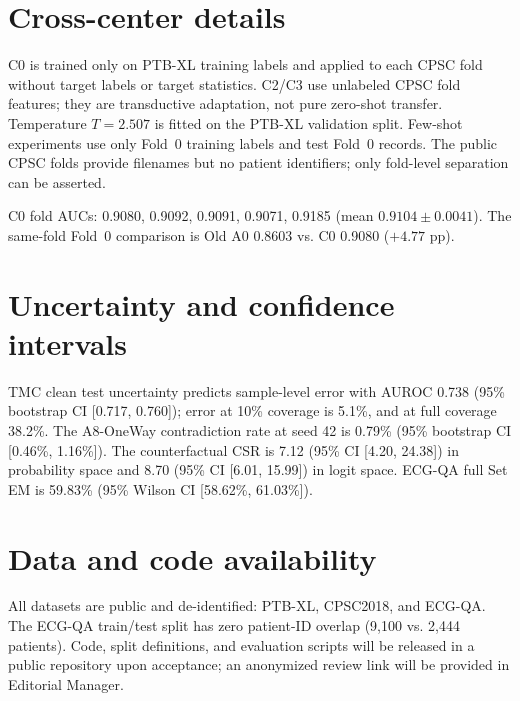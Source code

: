 \documentclass[11pt]{article}
\begin{document}
\section{Cross-center details}
C0 is trained only on PTB-XL training labels and applied to each CPSC fold without target labels or target statistics. C2/C3 use unlabeled CPSC fold features; they are transductive adaptation, not pure zero-shot transfer. Temperature $T=2.507$ is fitted on the PTB-XL validation split. Few-shot experiments use only Fold~0 training labels and test Fold~0 records. The public CPSC folds provide filenames but no patient identifiers; only fold-level separation can be asserted.

C0 fold AUCs: 0.9080, 0.9092, 0.9091, 0.9071, 0.9185 (mean $0.9104 \pm 0.0041$). The same-fold Fold~0 comparison is Old A0 0.8603 vs. C0 0.9080 ($+4.77$ pp).

\section{Uncertainty and confidence intervals}
TMC clean test uncertainty predicts sample-level error with AUROC 0.738 (95\% bootstrap CI [0.717, 0.760]); error at 10\% coverage is 5.1\%, and at full coverage 38.2\%. The A8-OneWay contradiction rate at seed 42 is 0.79\% (95\% bootstrap CI [0.46\%, 1.16\%]). The counterfactual CSR is 7.12 (95\% CI [4.20, 24.38]) in probability space and 8.70 (95\% CI [6.01, 15.99]) in logit space. ECG-QA full Set EM is 59.83\% (95\% Wilson CI [58.62\%, 61.03\%]).

\section{Data and code availability}
All datasets are public and de-identified: PTB-XL, CPSC2018, and ECG-QA. The ECG-QA train/test split has zero patient-ID overlap (9,100 vs. 2,444 patients). Code, split definitions, and evaluation scripts will be released in a public repository upon acceptance; an anonymized review link will be provided in Editorial Manager.
\end{document}
